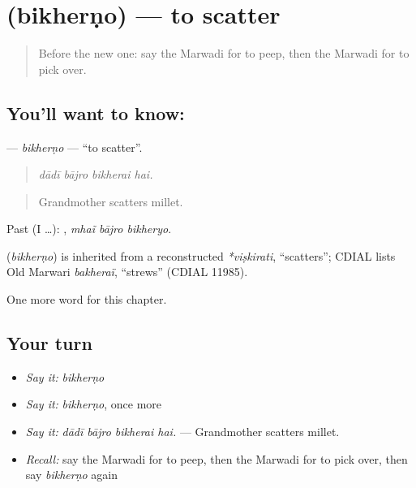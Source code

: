 \section[\texorpdfstring{\mw{बिखेरणो} (bikherṇo)}{बिखेरणो (bikherṇo)}]{ (bikherṇo) — to scatter}

\label{lesson:MW-C178-bikherno}



\begin{quote}
Before the new one: say the Marwadi for to peep, then the Marwadi for to pick over.
\end{quote}

\subsection*{You'll want to know: }
\textbf{} — \emph{bikherṇo} — \textquotedblleft{}to scatter\textquotedblright{}.

\begin{quote}
   
\end{quote}

\begin{quote}
\emph{dādī bājro bikherai hai.}
\end{quote}

\begin{quote}
Grandmother scatters millet.
\end{quote}

Past (I …):   , \emph{mhaĩ bājro bikheryo}.

\begin{cousinweb}
\textbf{} (\emph{bikherṇo}) is inherited from a reconstructed \emph{*viṣkirati}, \textquotedblleft{}scatters\textquotedblright{}; CDIAL lists Old Marwari \emph{bakheraï}, \textquotedblleft{}strews\textquotedblright{} (CDIAL 11985).
\end{cousinweb}

\begin{grammarlens}[title={What you've built}]
One more word for this chapter.
\end{grammarlens}

\subsection*{Your turn}
\begin{itemize}
\raggedright
  \item \emph{Say it:} \emph{bikherṇo}
  \item \emph{Say it:} \emph{bikherṇo}, once more
  \item \emph{Say it:} \emph{dādī bājro bikherai hai.} — Grandmother scatters millet.
  \item \emph{Recall:} say the Marwadi for to peep, then the Marwadi for to pick over, then say \emph{bikherṇo} again
\end{itemize}

